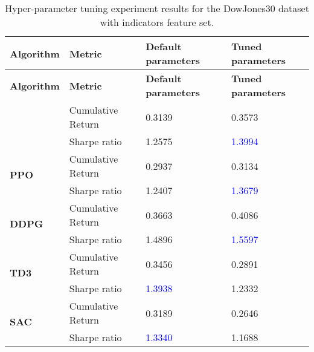 \begin{longtable}{|l|l|l|l|}
    \caption{Hyper-parameter tuning experiment results for the DowJones30 dataset with indicators feature set.}
    \label{tab:experiment_hyperparameters_indicators}
    \\ 
    \hline
    \textbf{Algorithm} & \textbf{Metric} & \textbf{Default parameters} & \textbf{Tuned parameters} \\ \midrule
    \endfirsthead

    \hline
    \textbf{Algorithm} & \textbf{Metric} & \textbf{Default parameters} & \textbf{Tuned parameters} \\ \midrule
    \endhead

    \endfoot
 
    \multirow{2}{*}{\textbf{A2C}}
    & Cumulative Return & 0.3139 & 0.3573 \\ \cline{2-4}
    & Sharpe ratio & 1.2575 & \textcolor{blue}{1.3994} \\ \midrule

    \multirow{2}{*}{\textbf{PPO}}
    & Cumulative Return & 0.2937 & 0.3134 \\ \cline{2-4}
    & Sharpe ratio & 1.2407 & \textcolor{blue}{1.3679} \\ \midrule

    \multirow{2}{*}{\textbf{DDPG}}
    & Cumulative Return & 0.3663 & 0.4086 \\ \cline{2-4}
    & Sharpe ratio & 1.4896 & \textcolor{blue}{1.5597} \\ \midrule

    \multirow{2}{*}{\textbf{TD3}}
    & Cumulative Return & 0.3456 & 0.2891 \\ \cline{2-4}
    & Sharpe ratio & \textcolor{blue}{1.3938} & 1.2332 \\ \midrule

    \multirow{2}{*}{\textbf{SAC}}
    & Cumulative Return & 0.3189 & 0.2646 \\ \cline{2-4}
    & Sharpe ratio & \textcolor{blue}{1.3340} & 1.1688 \\ \midrule
\end{longtable}
